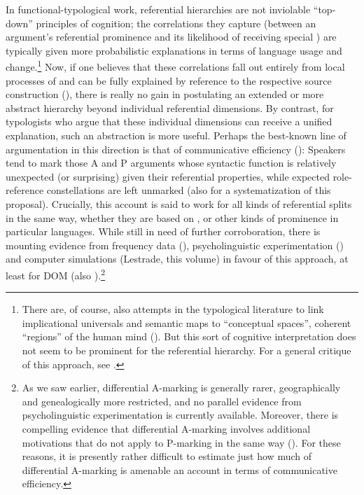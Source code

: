 \documentclass[output=paper]{langscibook}
\begin{document}
\newpage 
In functional-typological work, referential hierarchies are not inviolable “top-down” principles of cognition; the correlations they capture (\ie between an argument’s referential prominence and its likelihood of receiving special ) are typically given more probabilistic explanations in terms of language usage and change.\footnote{There are, of course, also attempts in the typological literature to link implicational universals and semantic maps to “conceptual spaces”, \ie coherent “regions” of the human mind (\cf \citealt{Croft2003Typology}). But this sort of cognitive interpretation does not seem to be prominent for the referential hierarchy. For a general critique of this approach, see \citet{Cristofaro2010Semantic}.} Now, if one believes that these correlations fall out entirely from local processes of  and can be fully explained by reference to the respective source construction (\eg \citealt{Cristofaro2013Referential}), there is really no gain in postulating an extended or more abstract hierarchy beyond individual referential dimensions. By contrast, for typologists who argue that these individual dimensions can receive a unified explanation, such an abstraction is more useful. Perhaps the best-known line of argumentation in this direction is that of communicative efficiency (\eg \citealt{Dixon1979Ergativity,Comrie1981Language,Newmeyer2005Possible,Haspelmath2008Creating,Hawkins2014Cross-linguistic}): Speakers tend to mark those A and P arguments whose syntactic function is relatively unexpected (or surprising) given their referential properties, while expected role-reference constellations are left unmarked (\cf also \citealt{Haspelmath2017Role-reference} for a systematization of this proposal). Crucially, this account is said to work for all kinds of referential splits in the same way, whether they are based on ,  or other kinds of prominence in particular languages. While still in need of further corroboration, there is mounting evidence from frequency data (\eg \citealt{Dahl2000Egophoricity,Fry2003Ellipsis,Lee2006Parallel,Jaeger2007Evolutionary}), psycholinguistic experimentation (\eg \citealt{Fedzechkinaetal2012Language,Kurumadaetal2015Communicative}) and computer simulations (\eg Lestrade, this volume) in favour of this approach, at least for DOM (\cf also \citealt{Levshina2017Differential}).\footnote{As we saw earlier, differential A-marking is generally rarer, geographically and genealogically more restricted, and no parallel evidence from psycholinguistic experimentation is currently available. Moreover, there is compelling evidence that differential A-marking involves additional motivations that do not apply to P-marking in the same way (\citealt{Hoopetal2008Case-marking,Fauconnieretal2014A}). For these reasons, it is presently rather difficult to estimate just how much of differential A-marking is amenable an account in terms of communicative efficiency.}
\end{document}
